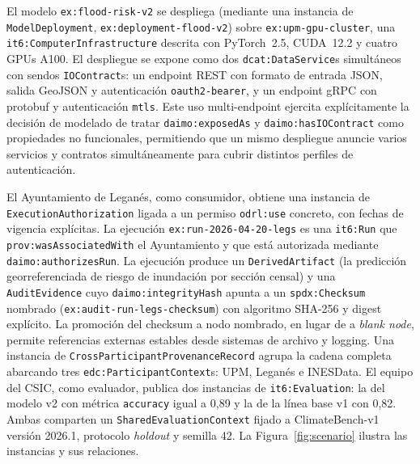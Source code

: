 \documentclass[Afour,sagev,times]{sagej}
\newcommand{\code}[1]{\texttt{#1}}
\begin{document}
El modelo \code{ex:flood-risk-v2} se despliega (mediante una instancia de \code{ModelDeployment}, \code{ex:deployment-flood-v2}) sobre \code{ex:upm-gpu-cluster}, una \code{it6:ComputerInfrastructure} descrita con PyTorch~2.5, CUDA~12.2 y cuatro GPUs A100. El despliegue se expone como dos \code{dcat:DataService}s simultáneos con sendos \code{IOContract}s: un endpoint REST con formato de entrada JSON, salida GeoJSON y autenticación \code{oauth2-bearer}, y un endpoint gRPC con protobuf y autenticación \code{mtls}. Este uso multi-endpoint ejercita explícitamente la decisión de modelado de tratar \code{daimo:exposedAs} y \code{daimo:hasIOContract} como propiedades no funcionales, permitiendo que un mismo despliegue anuncie varios servicios y contratos simultáneamente para cubrir distintos perfiles de autenticación.

El Ayuntamiento de Leganés, como consumidor, obtiene una instancia de \code{ExecutionAuthorization} ligada a un permiso \code{odrl:use} concreto, con fechas de vigencia explícitas. La ejecución \code{ex:run-2026-04-20-legs} es una \code{it6:Run} que \code{prov:wasAssociatedWith} el Ayuntamiento y que está autorizada mediante \code{daimo:authorizesRun}. La ejecución produce un \code{DerivedArtifact} (la predicción georreferenciada de riesgo de inundación por sección censal) y una \code{AuditEvidence} cuyo \code{daimo:integrityHash} apunta a un \code{spdx:Checksum} nombrado (\code{ex:audit-run-legs-checksum}) con algoritmo SHA-256 y digest explícito. La promoción del checksum a nodo nombrado, en lugar de a \emph{blank node}, permite referencias externas estables desde sistemas de archivo y logging. Una instancia de \code{CrossParticipantProvenanceRecord} agrupa la cadena completa abarcando tres \code{edc:ParticipantContext}s: UPM, Leganés e INESData. El equipo del CSIC, como evaluador, publica dos instancias de \code{it6:Evaluation}: la del modelo v2 con métrica \code{accuracy} igual a 0,89 y la de la línea base v1 con 0,82. Ambas comparten un \code{SharedEvaluationContext} fijado a ClimateBench-v1 versión 2026.1, protocolo \emph{holdout} y semilla 42. La Figura~\ref{fig:scenario} ilustra las instancias y sus relaciones.
\end{document}
